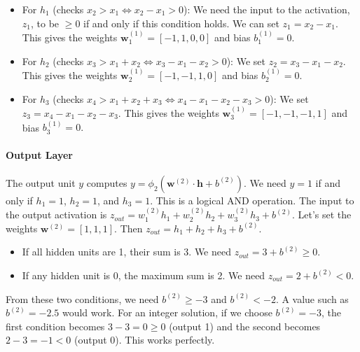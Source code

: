 \documentclass{article}
\begin{document}
\begin{itemize}
    \item For $h_1$ (checks $x_2 > x_1 \iff x_2 - x_1 > 0$): We need the input to the activation, $z_1$, to be $\ge 0$ if and only if this condition holds. We can set $z_1 = x_2 - x_1$. This gives the weights $\mathbf{w}^{(1)}_1 = [-1, 1, 0, 0]$ and bias $b^{(1)}_1 = 0$.
    
    \item For $h_2$ (checks $x_3 > x_1 + x_2 \iff x_3 - x_1 - x_2 > 0$): We set $z_2 = x_3 - x_1 - x_2$. This gives the weights $\mathbf{w}^{(1)}_2 = [-1, -1, 1, 0]$ and bias $b^{(1)}_2 = 0.$

    \item For $h_3$ (checks $x_4 > x_1 + x_2 + x_3 \iff x_4 - x_1 - x_2 - x_3 > 0$): We set $z_3 = x_4 - x_1 - x_2 - x_3$. This gives the weights $\mathbf{w}^{(1)}_3 = [-1, -1, -1, 1]$ and bias $b^{(1)}_3 = 0.$
\end{itemize}

\paragraph{Output Layer}
The output unit $y$ computes $y = \phi_2(\mathbf{w}^{(2)} \cdot \mathbf{h} + b^{(2)})$. We need $y=1$ if and only if $h_1=1$, $h_2=1$, and $h_3=1$. This is a logical AND operation.
The input to the output activation is $z_{out} = w^{(2)}_1 h_1 + w^{(2)}_2 h_2 + w^{(2)}_3 h_3 + b^{(2)}$.
Let's set the weights $\mathbf{w}^{(2)} = [1, 1, 1]$. Then $z_{out} = h_1 + h_2 + h_3 + b^{(2)}$.
\begin{itemize}
    \item If all hidden units are 1, their sum is 3. We need $z_{out} = 3 + b^{(2)} \ge 0$.
    \item If any hidden unit is 0, the maximum sum is 2. We need $z_{out} = 2 + b^{(2)} < 0$.
\end{itemize}
From these two conditions, we need $b^{(2)} \ge -3$ and $b^{(2)} < -2$. A value such as $b^{(2)} = -2.5$ would work. For an integer solution, if we choose $b^{(2)} = -3$, the first condition becomes $3-3=0 \ge 0$ (output 1) and the second becomes $2-3 = -1 < 0$ (output 0). This works perfectly.
\end{document}
